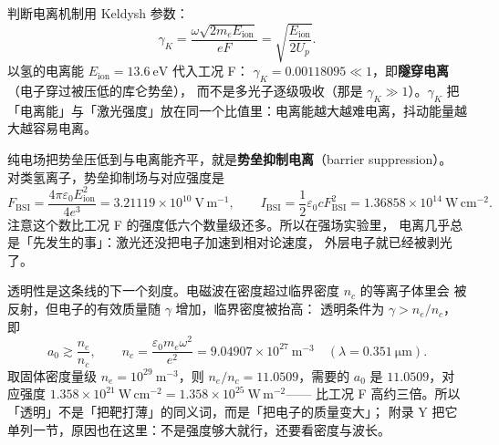 判断电离机制用 Keldysh 参数：
\begin{equation}
\gamma_K=\frac{\omega\sqrt{2m_eE_\mathrm{ion}}}{eF}
=\sqrt{\frac{E_\mathrm{ion}}{2U_p}}.
\label{eq:app-aw-keldysh}
\end{equation}
以氢的电离能 $E_\mathrm{ion}=13.6\ \mathrm{eV}$ 代入工况 F：
$\gamma_K=0.00118095\ll1$，即\textbf{隧穿电离}（电子穿过被压低的库仑势垒），
而不是多光子逐级吸收（那是 $\gamma_K\gg1$）。$\gamma_K$ 把
「电离能」与「激光强度」放在同一个比值里：电离能越大越难电离，抖动能量越大越容易电离。

纯电场把势垒压低到与电离能齐平，就是\textbf{势垒抑制电离}（barrier suppression）。
对类氢离子，势垒抑制场与对应强度是
\begin{equation}
F_\mathrm{BSI}=\frac{4\pi\varepsilon_0E_\mathrm{ion}^2}{4e^3}
=3.21119\times10^{10}\ \mathrm{V\,m^{-1}},
\qquad
I_\mathrm{BSI}=\frac{1}{2}\varepsilon_0cF_\mathrm{BSI}^2
=1.36858\times10^{14}\ \mathrm{W\,cm^{-2}}.
\label{eq:app-aw-bsi}
\end{equation}
注意这个数比工况 F 的强度低六个数量级还多。所以在强场实验里，
电离几乎总是「先发生的事」：激光还没把电子加速到相对论速度，
外层电子就已经被剥光了。

透明性是这条线的下一个刻度。电磁波在密度超过临界密度 $n_c$ 的等离子体里会
被反射，但电子的有效质量随 $\gamma$ 增加，临界密度被抬高：
透明条件为 $\gamma>n_e/n_c$，即
\begin{equation}
a_0\gtrsim\frac{n_e}{n_c},
\qquad
n_c=\frac{\varepsilon_0m_e\omega^2}{e^2}=9.04907\times10^{27}\ \mathrm{m^{-3}}
\quad(\lambda=0.351\ \mathrm{\mu m}).
\label{eq:app-aw-trans}
\end{equation}
取固体密度量级 $n_e=10^{29}\ \mathrm{m^{-3}}$，则
$n_e/n_c=11.0509$，需要的 $a_0$ 是 $11.0509$，对应强度
$1.358\times10^{21}\ \mathrm{W\,cm^{-2}}=1.358\times10^{25}\ \mathrm{W\,m^{-2}}$——
比工况 F 高约三倍。所以「透明」不是「把靶打薄」的同义词，而是「把电子的质量变大」；
附录 Y 把它单列一节，原因也在这里：不是强度够大就行，还要看密度与波长。

